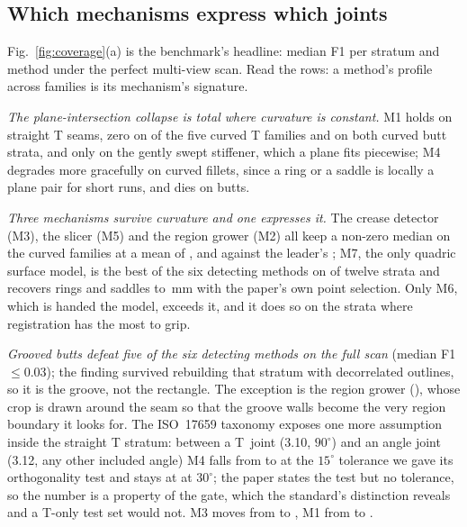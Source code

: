 \documentclass[letterpaper, 10 pt, conference]{ieeeconf}
\newcommand{\M}[1]{M#1}
\newcommand{\mm}{\,mm}
\begin{document}
\subsection{Which mechanisms express which joints}
Fig.~\ref{fig:coverage}(a) is the benchmark's headline: median F1 per stratum and method under the perfect multi-view scan. Read the rows: a method's profile across families is its mechanism's signature.

\emph{The plane-intersection collapse is total where curvature is constant.} \M1 holds \ransacTline{} on straight T seams, zero on \ransacCurvedZeros{} of the five curved T families and on both curved butt strata, and \ransacCurvedMax{} only on the gently swept stiffener, which a plane fits piecewise; \M4 degrades more gracefully on curved fillets, since a ring or a saddle is locally a plane pair for short runs, and dies on butts.

\emph{Three mechanisms survive curvature and one expresses it.} The crease detector (\M3), the slicer (\M5) and the region grower (\M2) all keep a non-zero median on the curved families at a mean of \lobbCurvedMean, \pcasliceCurvedMean{} and \regiongrowCurvedMean{} against the leader's \quadricCurvedMean; \M7, the only quadric surface model, is the best of the six detecting methods on \quadricBestDetectors{} of twelve strata and recovers rings and saddles to \quadricRingRmseMax\mm{} with the paper's own point selection. Only \M6, which is handed the model, exceeds it, and it does so on the strata where registration has the most to grip.

\emph{Grooved butts defeat five of the six detecting methods on the full scan} (median F1 $\leq0.03$); the finding survived rebuilding that stratum with decorrelated outlines, so it is the groove, not the rectangle. The exception is the region grower (\regiongrowGrooved), whose crop is drawn around the seam so that the groove walls become the very region boundary it looks for. The ISO~17659 taxonomy exposes one more assumption inside the straight T stratum: between a T~joint (3.10, $90^\circ$) and an angle joint (3.12, any other included angle) \M4 falls from \ppfTjoint{} to \ppfAngle{} at the $15^\circ$ tolerance we gave its orthogonality test and stays at \ppfTolThirtyAngle{} at $30^\circ$; the paper states the test but no tolerance, so the number is a property of the gate, which the standard's distinction reveals and a T-only test set would not. \M3 moves from \lobbTjoint{} to \lobbAngle{}, \M1 from \ransacTjoint{} to \ransacAngle.
\end{document}
